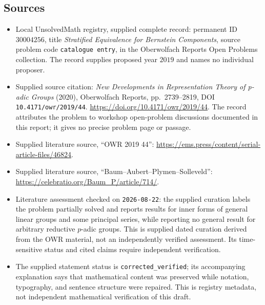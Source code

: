 \documentclass[11pt]{article}
\begin{document}
\subsection{Sources}
\begin{itemize}
\item Local UnsolvedMath registry, supplied complete record: permanent ID \(30004256\), title \emph{Stratified Equivalence for Bernstein Components}, source problem code \texttt{catalogue entry}, in the Oberwolfach Reports Open Problems collection. The record supplies proposed year \(2019\) and names no individual proposer.
\item Supplied source citation: \emph{New Developments in Representation Theory of p-adic Groups} (2020), Oberwolfach Reports, pp.~2739--2819, DOI \texttt{10.4171/owr/2019/44}. \url{https://doi.org/10.4171/owr/2019/44}. The record attributes the problem to workshop open-problem discussions documented in this report; it gives no precise problem page or passage.
\item Supplied literature source, ``OWR 2019 44'': \url{https://ems.press/content/serial-article-files/46824}.
\item Supplied literature source, ``Baum--Aubert--Plymen--Solleveld'': \url{https://celebratio.org/Baum_P/article/714/}.
\item Literature assessment checked on \texttt{2026-08-22}: the supplied curation labels the problem partially solved and reports results for inner forms of general linear groups and some principal series, while reporting no general result for arbitrary reductive \(p\)-adic groups. This is supplied dated curation derived from the OWR material, not an independently verified assessment. Its time-sensitive status and cited claims require independent verification.
\item The supplied statement status is \texttt{corrected\_verified}; its accompanying explanation says that mathematical content was preserved while notation, typography, and sentence structure were repaired. This is registry metadata, not independent mathematical verification of this draft.
\end{itemize}
\end{document}
